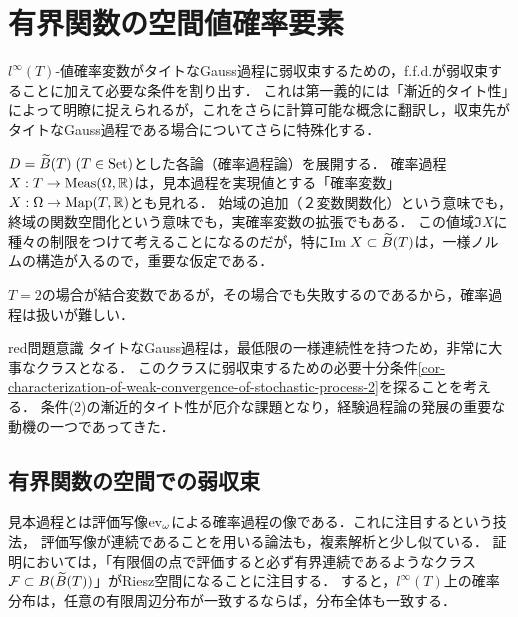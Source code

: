 \documentclass[uplatex,dvipdfmx]{jsreport}
\begin{document}
\section{有界関数の空間値確率要素}

\begin{tcolorbox}[colframe=ForestGreen, colback=ForestGreen!10!white,breakable,colbacktitle=ForestGreen!40!white,coltitle=black,fonttitle=\bfseries\sffamily,
title=]
    $l^\infty(T)$-値確率変数がタイトなGauss過程に弱収束するための，f.f.d.が弱収束することに加えて必要な条件を割り出す．
    これは第一義的には「漸近的タイト性」によって明瞭に捉えられるが，これをさらに計算可能な概念に翻訳し，収束先がタイトなGauss過程である場合についてさらに特殊化する．
\end{tcolorbox}

\begin{tcolorbox}[colframe=ForestGreen, colback=ForestGreen!10!white,breakable,colbacktitle=ForestGreen!40!white,coltitle=black,fonttitle=\bfseries\sffamily,
    title=動機付け]
    $D=\widetilde{B}(T)\;(T\in\mathrm{Set})$とした各論（確率過程論）を展開する．
    確率過程$X:T\to\mathrm{Meas}(\Omega,\mathbb{R})$は，見本過程を実現値とする「確率変数」$X:\Omega\to\mathrm{Map}(T,\mathbb{R})$とも見れる．
    始域の追加（２変数関数化）という意味でも，終域の関数空間化という意味でも，実確率変数の拡張でもある．
    この値域$\Im X$に種々の制限をつけて考えることになるのだが，特に$\mathrm{Im}\; X\subset\widetilde{B}(T)$は，一様ノルムの構造が入るので，重要な仮定である．

    $T=2$の場合が結合変数であるが，その場合でも失敗するのであるから，確率過程は扱いが難しい．
\end{tcolorbox}

\begin{tbox}{red}{問題意識}
    タイトなGauss過程は，最低限の一様連続性を持つため，非常に大事なクラスとなる．
    このクラスに弱収束するための必要十分条件\ref{cor-characterization-of-weak-convergence-of-stochastic-process-2}を探ることを考える．
    条件(2)の漸近的タイト性が厄介な課題となり，経験過程論の発展の重要な動機の一つであってきた．
\end{tbox}

\subsection{有界関数の空間での弱収束}

\begin{tcolorbox}[colframe=ForestGreen, colback=ForestGreen!10!white,breakable,colbacktitle=ForestGreen!40!white,coltitle=black,fonttitle=\bfseries\sffamily,
title=]
    見本過程とは評価写像$\mathrm{ev}_\omega$による確率過程の像である．これに注目するという技法，
    評価写像が連続であることを用いる論法も，複素解析と少し似ている．
    証明においては，「有限個の点で評価すると必ず有界連続であるようなクラス$\mathcal{F}\subset B(\widetilde{B}(T))$」がRiesz空間になることに注目する．
    すると，$l^\infty(T)$上の確率分布は，任意の有限周辺分布が一致するならば，分布全体も一致する．
\end{tcolorbox}
\end{document}
